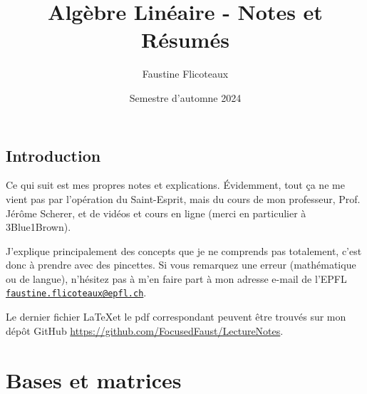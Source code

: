 \documentclass[10pt,a4paper]{book}
\title{Algèbre Linéaire - Notes et Résumés}
\author{Faustine Flicoteaux}
\date{Semestre d'automne 2024}
\begin{document}
\maketitle
\tableofcontents
\newpage


\section*{Introduction}
Ce qui suit est mes propres notes et explications. Évidemment, tout ça ne me vient pas par l'opération du Saint-Esprit, mais du cours de mon professeur, Prof. Jérôme Scherer, et de vidéos et cours en ligne (merci en particulier à 3Blue1Brown).\par 
J'explique principalement des concepts que je ne comprends pas totalement, c'est donc à prendre avec des pincettes. Si vous remarquez une erreur (mathématique ou de langue), n'hésitez pas à m'en faire part à mon adresse e-mail de l'EPFL \texttt{\href{mailto:faustine.flicoteaux@epfl.ch}{faustine.flicoteaux@epfl.ch}}.\par 
Le dernier fichier \LaTeX et le pdf correspondant peuvent être trouvés sur mon dépôt GitHub \url{https://github.com/FocusedFaust/LectureNotes}.


\chapter{Bases et matrices}
\end{document}
